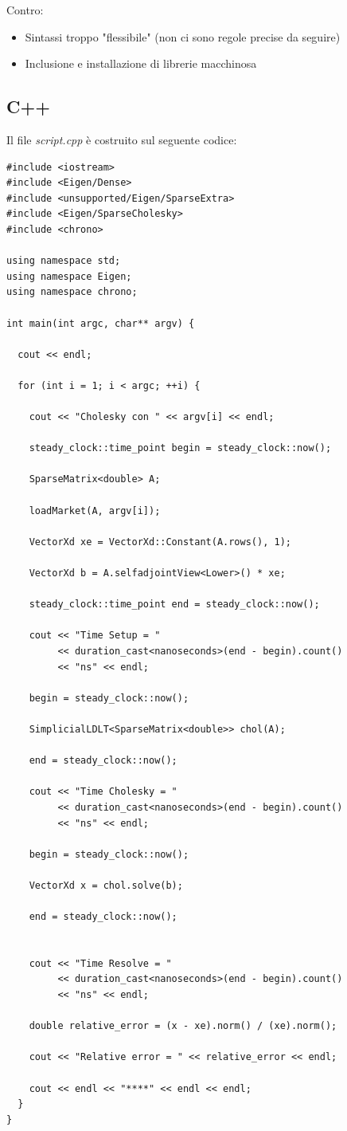 \documentclass[preprint,12pt]{elsarticle}
\begin{document}
Contro:
\begin{itemize}
	\item Sintassi troppo "flessibile" (non ci sono regole precise da seguire)
	\item Inclusione e installazione di librerie macchinosa
\end{itemize}

\newpage

\subsection*{C++}

Il file \textit{script.cpp} è costruito sul seguente codice:

\begin{verbatim}
#include <iostream>
#include <Eigen/Dense>
#include <unsupported/Eigen/SparseExtra>
#include <Eigen/SparseCholesky>
#include <chrono>

using namespace std;
using namespace Eigen;
using namespace chrono;

int main(int argc, char** argv) {	

  cout << endl;

  for (int i = 1; i < argc; ++i) {

    cout << "Cholesky con " << argv[i] << endl;		
    
    steady_clock::time_point begin = steady_clock::now();

    SparseMatrix<double> A;

    loadMarket(A, argv[i]);

    VectorXd xe = VectorXd::Constant(A.rows(), 1);

    VectorXd b = A.selfadjointView<Lower>() * xe;

    steady_clock::time_point end = steady_clock::now();

    cout << "Time Setup = " 
         << duration_cast<nanoseconds>(end - begin).count() 
         << "ns" << endl;
         
    begin = steady_clock::now();

    SimplicialLDLT<SparseMatrix<double>> chol(A);

    end = steady_clock::now();
    
    cout << "Time Cholesky = " 
         << duration_cast<nanoseconds>(end - begin).count()
         << "ns" << endl;
         
    begin = steady_clock::now();

    VectorXd x = chol.solve(b);
    
    end = steady_clock::now();

  
    cout << "Time Resolve = " 
         << duration_cast<nanoseconds>(end - begin).count() 
         << "ns" << endl;

    double relative_error = (x - xe).norm() / (xe).norm();

    cout << "Relative error = " << relative_error << endl;

    cout << endl << "****" << endl << endl;
  }
}
\end{verbatim}
\end{document}
